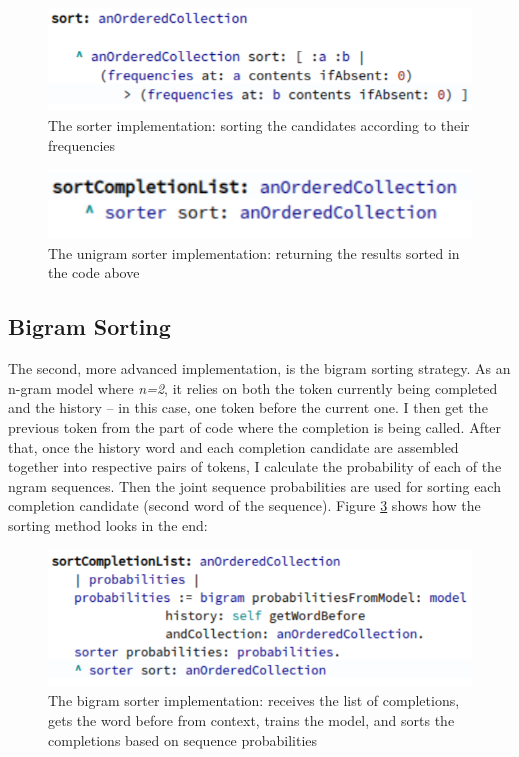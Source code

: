 \begin{figure}[H]
    \centering
    \includegraphics[width=0.9\linewidth]{images/unigramCode3.png}
    \caption{The sorter implementation: sorting the candidates according to their frequencies}
    \label{fig:unigramCode2}
\end{figure}

\begin{figure}[H]
    \centering
    \includegraphics[width=0.9\linewidth]{images/unigramCode2.png}
    \caption{The unigram sorter implementation: returning the results sorted in the code above}
    \label{fig:unigramCode3}
\end{figure}

\subsection{Bigram Sorting}
The second, more advanced implementation, is the bigram sorting strategy. As an n-gram model where \textit{n=2}, it relies on both the token currently being completed and the history -- in this case, one token before the current one. I then get the previous token from the part of code where the completion is being called. After that, once the history word and each completion candidate are assembled together into respective pairs of tokens, I calculate the probability of each of the ngram sequences. Then the joint sequence probabilities are used for sorting each completion candidate (second word of the sequence). Figure \ref{fig:bigramCode} shows how the sorting method looks in the end:

\begin{figure}[H]
    \centering
    \includegraphics[width=0.9\linewidth]{images/bigramCode.png}
    \caption{The bigram sorter implementation: receives the list of completions, gets the word before from context, trains the model, and sorts the completions based on sequence probabilities}
    \label{fig:bigramCode}
\end{figure}

